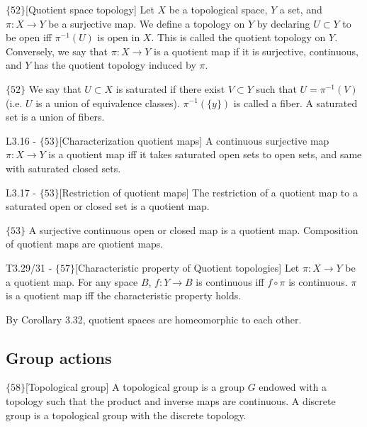 \documentclass{article}
\begin{document}
\begin{flexidefinition}{$\{52\}$}[Quotient space topology]
    Let $X$ be a topological space, $Y$ a set, and $\pi : X \to Y$ be a surjective map. We define a topology on $Y$ by declaring $U \subset Y$ to be open iff $\pi^{-1}(U)$ is open in $X$. This is called the quotient topology on $Y$. Conversely, we say that $\pi : X \to Y$ is a quotient map if it is surjective, continuous, and $Y$ has the quotient topology induced by $\pi$.
\end{flexidefinition}

$\{52\}$ We say that $U \subset X$ is saturated if there exist $V \subset Y$ such that $U = \pi^{-1}(V)$ (i.e. $U$ is a union of equivalence classes). $\pi^{-1}(\{y\})$ is called a fiber. A saturated set is a union of fibers.

\begin{flexilemma}{L3.16 - $\{53\}$}[Characterization quotient maps]
    A continuous surjective map $\pi : X \to Y$ is a quotient map iff it takes saturated open sets to open sets, and same with saturated closed sets.
\end{flexilemma}

\begin{flexilemma}{L3.17 - $\{53\}$}[Restriction of quotient maps]
    The restriction of a quotient map to a saturated open or closed set is a quotient map.
\end{flexilemma}

$\{53\}$ A surjective continuous open or closed map is a quotient map. Composition of quotient maps are quotient maps.

\begin{flexitheorem}{T3.29/31 - $\{57\}$}[Characteristic property of Quotient topologies]
    Let $\pi : X \to Y$ be a quotient map. For any space $B$, $f : Y \to B$ is continuous iff $f \circ \pi$ is continuous. $\pi$ is a quotient map iff the characteristic property holds.
\end{flexitheorem}

By Corollary 3.32, quotient spaces are homeomorphic to each other.

\subsection{Group actions}

\begin{flexidefinition}{$\{58\}$}[Topological group]
    A topological group is a group $G$ endowed with a topology such that the product and inverse maps are continuous. A discrete group is a topological group with the discrete topology.
\end{flexidefinition}
\end{document}
